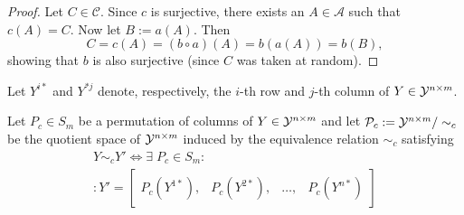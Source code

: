 \begin{appendices}
\begin{proof}
Let $C \in \mathcal{C}$. Since $c$ is surjective, there exists an $A \in \mathcal{A}$ such that $c(A) = C$. Now let $B:=a(A)$. Then 
\begin{equation*}
    C = c(A) = (b\circ a)(A) = b(a(A)) = b(B),
\end{equation*}
showing that $b$ is also surjective (since $C$ was taken at random).
\end{proof}


\begin{definition}
Let $Y^{i\ast}$ and $Y^{\ast j}$ denote, respectively, the $i$-th row and $j$-th column of $Y\in \mathcal{Y}^{n \times m}$.
\end{definition}

\begin{definition}%
Let $P_c\in S_m$ be a permutation of columns of $Y \in \mathcal{Y}^{n \times m}$ and let $\mathcal{P}_c:=\mathcal{Y}^{n \times m}/\sim_c$ be the quotient space of $\mathcal{Y}^{n \times m}$ induced by the equivalence relation $\sim_c$ satisfying
\begin{multline}
     Y \sim_c Y' \iff \exists \;P_c \in S_m :\\
     : Y' = \begin{bmatrix}
         P_c(Y^{1 \ast}), &
         P_c(Y^{2 \ast}), &
         \dots, &
         P_c(Y^{n \ast})
     \end{bmatrix}
\end{multline}
\end{definition}



\end{appendices}
